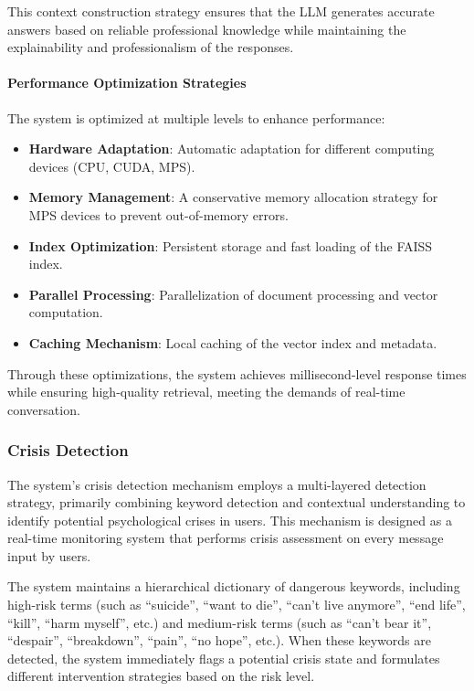 This context construction strategy ensures that the LLM generates accurate answers based on reliable professional knowledge while maintaining the explainability and professionalism of the responses.

\paragraph{Performance Optimization Strategies}

The system is optimized at multiple levels to enhance performance: \begin{itemize} \item \textbf{Hardware Adaptation}: Automatic adaptation for different computing devices (CPU, CUDA, MPS). \item \textbf{Memory Management}: A conservative memory allocation strategy for MPS devices to prevent out-of-memory errors. \item \textbf{Index Optimization}: Persistent storage and fast loading of the FAISS index. \item \textbf{Parallel Processing}: Parallelization of document processing and vector computation. \item \textbf{Caching Mechanism}: Local caching of the vector index and metadata. \end{itemize}

Through these optimizations, the system achieves millisecond-level response times while ensuring high-quality retrieval, meeting the demands of real-time conversation.

\subsubsection{Crisis Detection}

The system's crisis detection mechanism employs a multi-layered detection strategy, primarily combining keyword detection and contextual understanding to identify potential psychological crises in users. This mechanism is designed as a real-time monitoring system that performs crisis assessment on every message input by users.

The system maintains a hierarchical dictionary of dangerous keywords, including high-risk terms (such as ``suicide'', ``want to die'', ``can't live anymore'', ``end life'', ``kill'', ``harm myself'', etc.) and medium-risk terms (such as ``can't bear it'', ``despair'', ``breakdown'', ``pain'', ``no hope'', etc.). When these keywords are detected, the system immediately flags a potential crisis state and formulates different intervention strategies based on the risk level.

